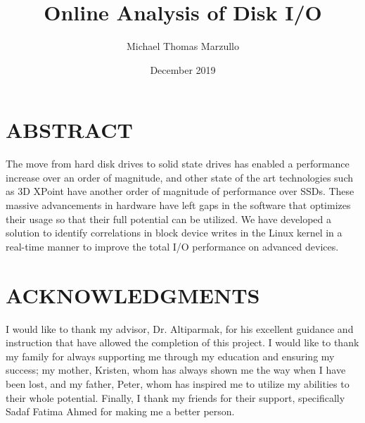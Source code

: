 \documentclass[MEng]{uofl}
\begin{document}
\title{Online Analysis of Disk I/O}
\author{Michael Thomas Marzullo}


\date{December 2019}
\maketitle

\chapter*{ABSTRACT}
The move from hard disk drives to solid state drives has enabled a performance increase over an order of magnitude, 
and other state of the art technologies such as 3D XPoint have another order of magnitude of performance over SSDs. 
These massive advancements in hardware have left gaps in the software that optimizes their usage so that their full 
potential can be utilized. We have developed a solution to identify correlations in block device writes in the Linux 
kernel in a real-time manner to improve the total I/O performance on advanced devices.

\chapter*{ACKNOWLEDGMENTS}
I would like to thank my advisor, Dr. Altiparmak, for his excellent guidance 
and instruction that have allowed the completion of this project. I would like to 
thank my family for always supporting me through my education and ensuring my 
success; my mother, Kristen, whom has always shown me the way when I have been 
lost, and my father, Peter, whom has inspired me to utilize my abilities to their
whole potential. Finally, I thank my friends for their support, specifically Sadaf Fatima Ahmed for making me a better person.
\end{document}

